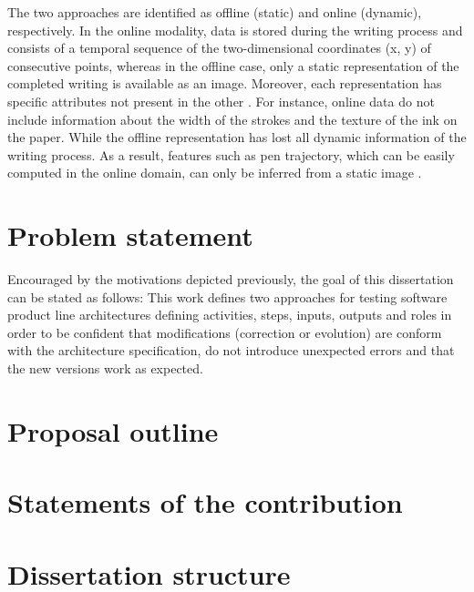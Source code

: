 The two approaches are identified as offline (static) and online (dynamic), respectively. In the online modality, data is stored during the writing process and consists of a temporal sequence of the two-dimensional coordinates (x, y) of consecutive points, whereas in the offline case, only a static representation of the completed writing is available as an image. Moreover, each representation has specific attributes not present in the other \cite{viard1999ireste}. For instance, online data do not include information about the width of the strokes and the texture of the ink on the paper. While the offline representation has lost all dynamic information of the writing process. As a result, features such as pen trajectory, which can be easily computed in the online domain, can only be inferred from a static image \cite{nel2005estimating}.


\section{Problem statement}
Encouraged by the motivations depicted previously, the goal of this dissertation can be stated as follows:
This work defines two approaches for testing software product line architectures defining activities, steps, inputs, outputs and roles in order to be confident that modifications
(correction or evolution) are conform with the architecture specification, do not introduce unexpected errors and that the new versions work as expected.

\section{Proposal outline}

\section{Statements of the contribution}

\section{Dissertation structure}






